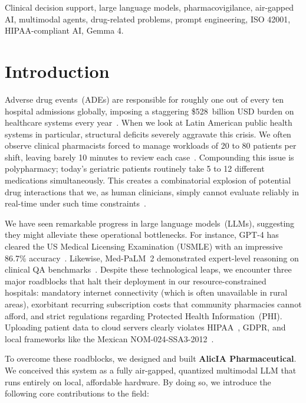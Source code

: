 \documentclass[9pt,conference]{IEEEtran}
\begin{document}
\begin{IEEEkeywords}
Clinical decision support, large language models, pharmacovigilance,
air-gapped AI, multimodal agents, drug-related problems, prompt engineering,
ISO 42001, HIPAA-compliant AI, Gemma 4.
\end{IEEEkeywords}

\section{Introduction}
\label{sec:intro}

Adverse drug events~(ADEs) are responsible for roughly one out of every ten hospital admissions globally, imposing a staggering \$528~billion USD burden on healthcare systems every year~\cite{who_prm,Pirmohamed15}. When we look at Latin American public health systems in particular, structural deficits severely aggravate this crisis. We often observe clinical pharmacists forced to manage workloads of 20 to 80 patients per shift, leaving barely 10 minutes to review each case~\cite{granada2007}. Compounding this issue is polypharmacy; today's geriatric patients routinely take 5 to 12 different medications simultaneously. This creates a combinatorial explosion of potential drug interactions that we, as human clinicians, simply cannot evaluate reliably in real-time under such time constraints~\cite{samuel20232023}.

We have seen remarkable progress in large language models~(LLMs), suggesting they might alleviate these operational bottlenecks. For instance, GPT-4 has cleared the US Medical Licensing Examination (USMLE) with an impressive 86.7\% accuracy~\cite{nori2023capabilitiesgpt4medicalchallenge}. Likewise, Med-PaLM~2 demonstrated expert-level reasoning on clinical QA benchmarks~\cite{singhal2022largelanguagemodelsencode}. Despite these technological leaps, we encounter three major roadblocks that halt their deployment in our resource-constrained hospitals: mandatory internet connectivity (which is often unavailable in rural areas), exorbitant recurring subscription costs that community pharmacies cannot afford, and strict regulations regarding Protected Health Information~(PHI). Uploading patient data to cloud servers clearly violates HIPAA~\cite{hipaa}, GDPR, and local frameworks like the Mexican NOM-024-SSA3-2012~\cite{nom024ssa32012}.

To overcome these roadblocks, we designed and built \textbf{AlicIA Pharmaceutical}. We conceived this system as a fully air-gapped, quantized multimodal LLM that runs entirely on local, affordable hardware. By doing so, we introduce the following core contributions to the field:
\end{document}
